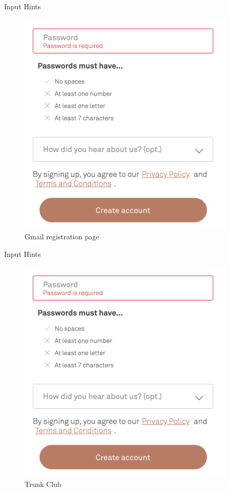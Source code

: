 \documentclass{beamer}
\begin{document}
\begin{frame}[t]{Input Hints}
	\begin{figure}[h]
		\centering
		\includegraphics[scale=0.6]{images/lec08-pic44.png}
		\caption{Gmail registration page}
	\end{figure}
\end{frame}

\begin{frame}[t]{Input Hints}
	\begin{figure}[h]
		\centering
		\includegraphics[scale=0.6]{images/lec08-pic45.png}
		\caption{Trunk Club}
	\end{figure}
\end{frame}
\end{document}
